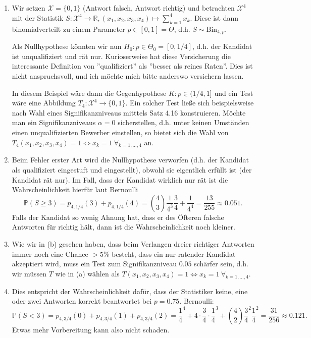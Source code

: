 \documentclass[a4paper]{article}
\begin{document}
\subsection{}

\begin{enumerate}
    \item Wir setzen $\mathcal{X} = \{0,1\}$ (Antwort falsch, Antwort richtig) und betrachten $\mathcal{X}^4$ mit der Statistik $S: \mathcal{X}^4 \to \mathds{R}, (x_1, x_2, x_3, x_4) \mapsto \sum_{k = 1}^{4} x_k$.
    Diese ist dann binomialverteilt zu einem Parameter $p \in [0,1] = \Theta$, d.h. $S \sim \mathrm{Bin}_{4, p}$.

    Als Nullhypothese könnten wir nun $H_0: p \in \Theta_0 = [0, 1/4]$, d.h. der Kandidat ist unqualifiziert und rät nur.
    Kurioserweise hat diese Versicherung die interessante Definition von ''qualifiziert'' als ''besser als reines Raten''.
    Dies ist nicht anspruchsvoll, und ich möchte mich bitte anderswo versichern lassen.

    In diesem Beispiel wäre dann die Gegenhypothese $K: p \in (1/4, 1]$ und ein Test wäre eine Abbildung $T_4: \mathcal{X}^4 \to \{0,1\}$.
    Ein solcher Test ließe sich beispielsweise nach Wahl eines Signifikanzniveaus mitttels Satz 4.16 konstruieren. Möchte man ein Signifikanzniveaus $\alpha = 0$ sicherstellen, d.h. unter keinen Umständen einen unqualifizierten Bewerber einstellen, so bietet sich die Wahl von $T_4(x_1, x_2, x_3, x_4) = 1 \iff x_k = 1 \ \forall_{k = 1, \dots, 4}$ an.
    \item Beim Fehler erster Art wird die Nullhypothese verworfen (d.h. der Kandidat als qualifiziert eingestuft und eingestellt), obwohl sie eigentlich erfüllt ist (der Kandidat rät nur). 
    Im Fall, dass der Kandidat wirklich nur rät ist die Wahrscheinlichkeit hierfür laut Bernoulli
    \begin{equation*}
        \mathds{P}(S \geq 3) = p_{4, 1/4}(3) + p_{4, 1/4}(4) = \binom{4}{3} \frac{1}{4^3} \frac{3}{4} + \frac{1}{4^4} = \frac{13}{255} \approx 0.051\text{.}
    \end{equation*}
    Falls der Kandidat so wenig Ahnung hat, dass er des Öfteren falsche Antworten für richtig hält, dann ist die Wahrscheinlichkeit noch kleiner.
    \item Wie wir in (b) gesehen haben, dass beim Verlangen dreier richtiger Antworten immer noch eine Chance $> 5\%$ besteht, dass ein nur-ratender Kandidat akzeptiert wird, muss ein Test zum Signifikanzniveau $0.05$ schärfer sein, d.h. wir müssen $T$ wie in (a) wählen als $T(x_1, x_2, x_3, x_4) = 1 \iff x_k = 1 \ \forall_{k = 1, \dots, 4}$.
    \item Dies entspricht der Wahrscheinlichkeit dafür, dass der Statistiker keine, eine oder zwei Antworten korrekt beantwortet bei $p = 0.75$. Bernoulli:
    \begin{equation*}
        \mathds{P}(S < 3) = p_{4, 3/4}(0) + p_{4, 3/4}(1) + p_{4, 3/4}(2) = \frac{1}{4}^4 + 4 \cdot \frac{3}{4} \cdot \frac{1}{4}^3 + \binom{4}{2} \frac{3}{4}^2 \frac{1}{4}^2 = \frac{31}{256} \approx 0.121\text{.}
    \end{equation*}
    Etwas mehr Vorbereitung kann also nicht schaden.
\end{enumerate}
\end{document}
